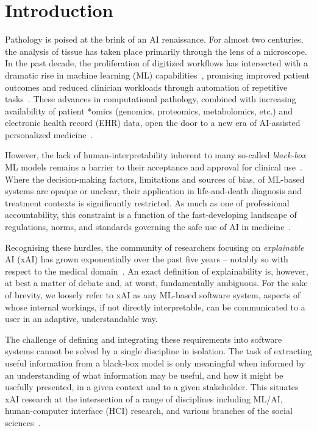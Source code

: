 \documentclass[final,5p,times,twocolumn,hyphens]{elsarticle}
\begin{document}
\section{Introduction}
\label{sec:introduction}

Pathology is poised at the brink of an AI renaissance. For almost two centuries, the analysis of tissue has taken place primarily through the lens of a microscope. In the past decade, the proliferation of digitized workflows has intersected with a dramatic rise in machine learning (ML) capabilities~\cite{Pantanowitz:2010:DigitalPathology,PantanowitzEtAl:2021:AIPatho}, promising improved patient outcomes and reduced clinician workloads through automation of repetitive tasks~\cite{das2020computer}. These advances in computational pathology, combined with increasing availability of patient *omics (genomics, proteomics, metabolomics, etc.) and electronic health record (EHR) data, open the door to a new era of AI-assisted personalized medicine~\cite{acs2020artificial,holzinger_artificial_2020}.

However, the lack of human-interpretability inherent to many so-called \textit{black-box} ML models remains a barrier to their acceptance and approval for clinical use~\cite{cui2021artificial}. Where the decision-making factors, limitations and sources of bias, of ML-based systems are opaque or unclear, their application in life-and-death diagnosis and treatment contexts is significantly restricted. As much as one of professional accountability, this constraint is a function of the fast-developing landscape of regulations, norms, and standards governing the safe use of AI in medicine~\cite{EU_White, ISO_IEC_TR_24028}.

Recognising these hurdles, the community of researchers focusing on \textit{explainable} AI (xAI) has grown exponentially over the past five years -- notably so with respect to the medical domain~\cite{tjoa_survey_2020,poceviciute_survey_2020}. An exact definition of explainability is, however, at best a matter of debate and, at worst, fundamentally ambiguous. For the sake of brevity, we loosely refer to xAI as any ML-based software system, aspects of whose internal workings, if not directly interpretable, can be communicated to a user in an adaptive, understandable way. 

The challenge of defining and integrating these requirements into software systems cannot be solved by a single discipline in isolation. The task of extracting useful information from a black-box model is only meaningful when informed by an understanding of what information may be useful, and how it might be usefully presented, in a given context and to a given stakeholder. This situates xAI research at the intersection of a range of disciplines including ML/AI, human-computer interface (HCI) research, and various branches of the social sciences~\cite{HolzingerEtAl:2020:QualityOfExplanations,zednik2019solving, miller2019explanation}.
\end{document}
